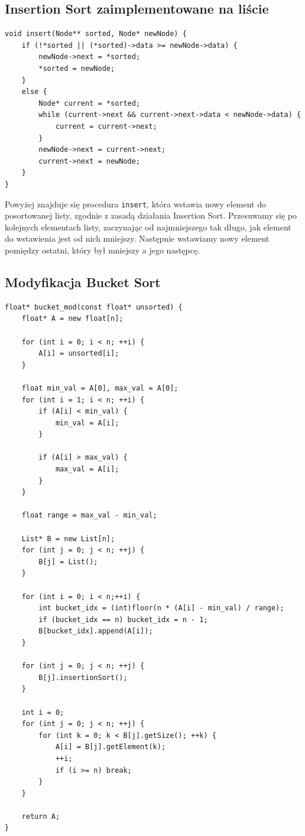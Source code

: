 \documentclass{article}
\begin{document}
\subsection{Insertion Sort zaimplementowane na liście}

\begin{verbatim}
void insert(Node** sorted, Node* newNode) {
    if (!*sorted || (*sorted)->data >= newNode->data) {
        newNode->next = *sorted;
        *sorted = newNode;
    }
    else {
        Node* current = *sorted;
        while (current->next && current->next->data < newNode->data) {
            current = current->next;
        }
        newNode->next = current->next;
        current->next = newNode;
    }
}
\end{verbatim}

Powyżej znajduje się procedura \texttt{insert}, która wstawia nowy element do posortowanej listy, zgodnie z zasadą działania Insertion Sort. Przesuwamy się po kolejnych elementach listy, zaczynając od najmniejszego tak długo, jak element do wstawienia jest od nich mniejszy. Następnie wstawiamy nowy element pomiędzy ostatni, który był mniejszy a jego następcę.

\subsection{Modyfikacja Bucket Sort}

\begin{verbatim}
float* bucket_mod(const float* unsorted) {
	float* A = new float[n];

	for (int i = 0; i < n; ++i) {
		A[i] = unsorted[i];
	}

	float min_val = A[0], max_val = A[0];
	for (int i = 1; i < n; ++i) {
		if (A[i] < min_val) {
			min_val = A[i];
		}
		
		if (A[i] > max_val) {
			max_val = A[i];
		}
	}

	float range = max_val - min_val;

	List* B = new List[n];
	for (int j = 0; j < n; ++j) {
		B[j] = List();
	}

	for (int i = 0; i < n;++i) {
		int bucket_idx = (int)floor(n * (A[i] - min_val) / range);
		if (bucket_idx == n) bucket_idx = n - 1;
		B[bucket_idx].append(A[i]);
	}

	for (int j = 0; j < n; ++j) {
		B[j].insertionSort();
	}

	int i = 0;
	for (int j = 0; j < n; ++j) {
		for (int k = 0; k < B[j].getSize(); ++k) {
			A[i] = B[j].getElement(k);
			++i;
			if (i >= n) break;
		}
	}

	return A;
}
\end{verbatim}
\end{document}
